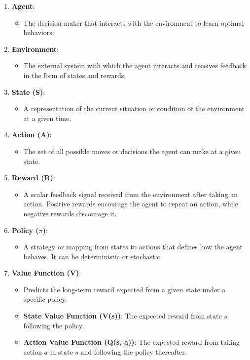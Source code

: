 \begin{enumerate}
    \item \textbf{Agent}:
    \begin{itemize}
        \item The decision-maker that interacts with the environment to learn optimal behaviors.
    \end{itemize}

    \item \textbf{Environment}:
    \begin{itemize}
        \item The external system with which the agent interacts and receives feedback in the form of states and rewards.
    \end{itemize}

    \item \textbf{State (S)}:
    \begin{itemize}
        \item A representation of the current situation or condition of the environment at a given time.
    \end{itemize}

    \item \textbf{Action (A)}:
    \begin{itemize}
        \item The set of all possible moves or decisions the agent can make at a given state.
    \end{itemize}

    \item \textbf{Reward (R)}:
    \begin{itemize}
        \item A scalar feedback signal received from the environment after taking an action. Positive rewards encourage the agent to repeat an action, while negative rewards discourage it.
    \end{itemize}

    \item \textbf{Policy ($\pi$)}:
    \begin{itemize}
        \item A strategy or mapping from states to actions that defines how the agent behaves. It can be deterministic or stochastic.
    \end{itemize}

    \item \textbf{Value Function (V)}:
    \begin{itemize}
        \item Predicts the long-term reward expected from a given state under a specific policy.
        \item \textbf{State Value Function (V(s))}: The expected reward from state $s$ following the policy.
        \item \textbf{Action Value Function (Q(s, a))}: The expected reward from taking action $a$ in state $s$ and following the policy thereafter.
    \end{itemize}


\end{enumerate}
